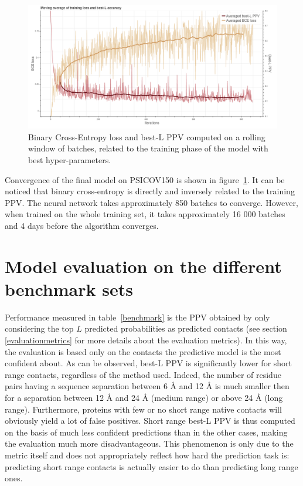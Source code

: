     \begin{figure}[H]
        \begin{center}
            \includegraphics[width=\textwidth, keepaspectratio]{imgs/loss.png}
            \caption{Binary Cross-Entropy loss and best-L PPV computed on
              a rolling window of batches, related to the training phase of the model
              with best hyper-parameters.}
            \label{lossandppv}
        \end{center}
    \end{figure}

    Convergence of the final model on PSICOV150 is shown in figure~\ref{lossandppv}.
    It can be noticed that binary cross-entropy is directly and inversely
    related to the training PPV. The neural network takes approximately 850
    batches to converge. However, when trained on the whole training set, it takes
    approximately 16 000 batches and 4 days before the algorithm converges.

\section{Model evaluation on the different benchmark sets}

    Performance measured in table~\ref{benchmark} is the PPV obtained
    by only considering the top $L$ predicted probabilities as predicted
    contacts (see section \ref{evaluationmetrics} for more details about the evaluation
    metrics). In this way, the evaluation is based only on the contacts
    the predictive model is the most confident about.
    As can be observed, best-L PPV is significantly lower for short range contacts,
    regardless of the method used. Indeed, the number of residue pairs having a
    sequence separation between 6 \AA{} and 12 \AA{} is much smaller then for a
    separation between 12 \AA{} and 24 \AA{} (medium range) or above 24 \AA{} (long range).
    Furthermore, proteins with few or no short range native contacts will obviously yield
    a lot of false positives.
    Short range best-L PPV is thus computed on the basis of much less confident
    predictions than in the other cases, making the evaluation much more disadvantageous.
    This phenomenon is only due to the metric itself and does not appropriately reflect how hard
    the prediction task is: predicting short range contacts is actually easier to do
    than predicting long range ones.


